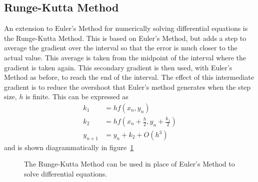 \documentclass[11pt]{article} %
\begin{document}
\subsection{Runge-Kutta Method}
An extension to Euler's Method for numerically solving differential equations is the Runge-Kutta Method. This is based on Euler's Method, but adds a step to average the gradient over the interval so that the error is much closer to the actual value. This average is taken from the midpoint of the interval where the gradient is taken again. This secondary gradient is then used, with Euler's Method as before, to reach the end of the interval. The effect of this intermediate gradient is to reduce the overshoot that Euler's method generates when the step size, $h$ is finite. This can be expressed as 
\begin{align*}
	k_1 &= hf(x_n,y_n) \\
	k_2 &= hf(x_n + \frac{h}{2}, y_n + \frac{k_1}{2}) \\
	y_{n+1} &= y_n + k_2 +O(h^3)
\end{align*}
and is shown diagrammatically in figure~\ref{fig:rungekutta}
\begin{figure}[ht]
	\centering
	
	\caption{\label{fig:rungekutta}The Runge-Kutta Method can be used in place of Euler's Method to solve differential equations.} 
\end{figure}
\end{document}
